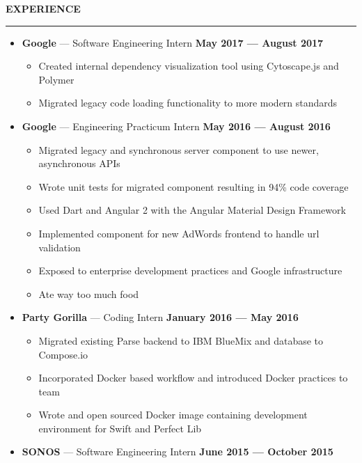 \documentclass[10pt, oneside]{letter}
\newcommand{\linespaceshit} {
  \vspace{0.05in}
  \hrule
  \vspace{0.05in}
}
\begin{document}
  \textbf{EXPERIENCE}
  \linespaceshit
    \begin{adjustwidth}{0.1in}{0pt}

      \begin{itemize}
        \item
          \textbf{Google} --- Software Engineering Intern \hfill  \textbf{May 2017 --- August 2017}
            \begin{itemize}
              \item Created internal dependency visualization tool using Cytoscape.js and Polymer
              \item Migrated legacy code loading functionality to more modern standards
            \end{itemize}
        \item
          \textbf{Google} --- Engineering Practicum Intern \hfill  \textbf{May 2016 --- August 2016}
            \begin{itemize}
              \item Migrated legacy and synchronous server component to use newer, asynchronous APIs
              \item Wrote unit tests for migrated component resulting in 94\% code coverage
              \item Used Dart and Angular 2 with the Angular Material Design Framework
              \item Implemented component for new AdWords frontend to handle url validation
              \item Exposed to enterprise development practices and Google infrastructure
              \item Ate way too much food
            \end{itemize}
        \item
          \textbf{Party Gorilla} --- Coding Intern \hfill \textbf{January 2016 --- May 2016}
            \begin{itemize}
              \item Migrated existing Parse backend to IBM BlueMix and database to Compose.io
              \item Incorporated Docker based workflow and introduced Docker practices to team
              \item Wrote and open sourced Docker image containing development environment for Swift and Perfect Lib
            \end{itemize}
        \item
          \textbf{SONOS} --- Software Engineering Intern \hfill \textbf{June 2015 --- October 2015}

\end{itemize}
\end{adjustwidth}
\end{document}
